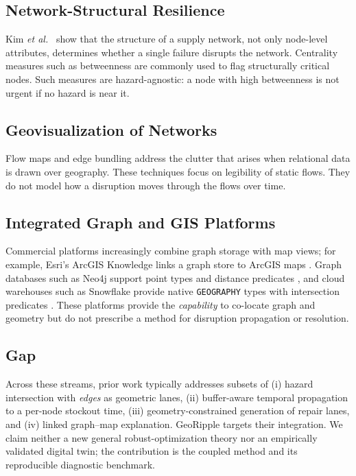\documentclass[conference]{IEEEtran}
\begin{document}
\subsection{Network-Structural Resilience}
Kim \textit{et al.}~\cite{kim2015} show that the structure of a supply
network, not only node-level attributes, determines whether a single
failure disrupts the network. Centrality measures such as betweenness
\cite{freeman1977,brandes2001} are commonly used to flag structurally
critical nodes. Such measures are hazard-agnostic: a node with high
betweenness is not urgent if no hazard is near it.

\subsection{Geovisualization of Networks}
Flow maps \cite{phan2005,jenny2017} and edge bundling
\cite{holten2006,holten2009} address the clutter that arises when
relational data is drawn over geography. These techniques focus on
legibility of static flows. They do not model how a disruption moves
through the flows over time.

\subsection{Integrated Graph and GIS Platforms}
Commercial platforms increasingly combine graph storage with map views;
for example, Esri's ArcGIS Knowledge links a graph store to ArcGIS maps
\cite{esriknowledge}. Graph databases such as Neo4j support point types
and distance predicates \cite{neo4j}, and cloud warehouses such as
Snowflake provide native \texttt{GEOGRAPHY} types with intersection
predicates \cite{snowflakegeo}. These platforms provide the
\emph{capability} to co-locate graph and geometry but do not prescribe a
method for disruption propagation or resolution.

\subsection{Gap}
Across these streams, prior work typically addresses subsets of (i) hazard
intersection with \emph{edges} as geometric lanes, (ii) buffer-aware temporal
propagation to a per-node stockout time, (iii) geometry-constrained generation
of repair lanes, and (iv) linked graph--map explanation. GeoRipple targets
their integration. We claim neither a new general robust-optimization theory
nor an empirically validated digital twin; the contribution is the coupled
method and its reproducible diagnostic benchmark.
\end{document}
